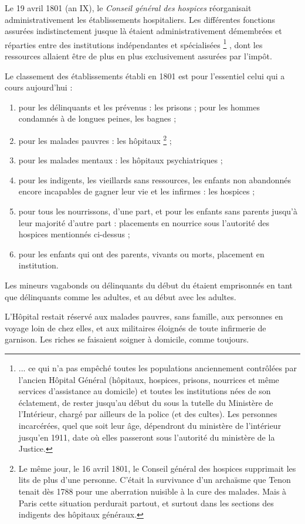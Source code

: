  Le 19 avril 1801 (an IX), le \emph{Conseil général des hospices} réorganisait administrativement les établissements hospitaliers. Les différentes fonctions assurées indistinctement jusque là étaient administrativement démembrées et réparties entre des institutions indépendantes et spécialisées%
\footnote{... ce qui n'a pas empêché toutes les populations anciennement contrôlées par l'ancien Hôpital Général (hôpitaux, hospices, prisons, nourrices et même services d'assistance au domicile) et toutes les institutions nées de son éclatement, de rester jusqu'au début du  sous la tutelle du Ministère de l'Intérieur, chargé par ailleurs de la police (et des cultes). Les personnes incarcérées, quel que soit leur âge, dépendront du ministère de l'intérieur jusqu'en 1911, date où elles passeront sous l'autorité du ministère de la Justice.}%
, dont les ressources allaient être de plus en plus exclusivement assurées par l'impôt. 

 Le classement des établissements établi en 1801 est pour l'essentiel celui qui a cours aujourd'hui :
\begin{enumerate}
\item pour les délinquants et les prévenus : les prisons ; pour les hommes condamnés à de longues peines, les bagnes ;
\item pour les malades pauvres : les hôpitaux%
\footnote{Le même jour, le 16 avril 1801, le Conseil général des hospices supprimait les lits de plus d'une personne. C'était la survivance d'un archaïsme que Tenon tenait dès 1788 pour une aberration nuisible à la cure des malades. Mais à Paris cette situation perdurait partout, et surtout dans les sections des indigents des hôpitaux généraux.} 
;
\item pour les malades mentaux : les hôpitaux psychiatriques ;
\item pour les indigents, les vieillards sans ressources, les enfants non abandonnés encore incapables de gagner leur vie et les infirmes : les hospices ;
\item pour tous les nourrissons, d'une part, et pour les enfants sans parents jusqu'à leur majorité d'autre part : placements en nourrice sous l'autorité des hospices mentionnés ci-dessus ;
\item pour les enfants qui ont des parents, vivants ou morts, placement en institution.
\end{enumerate}

 Les mineurs vagabonds ou délinquants du début du  étaient emprisonnés en tant que délinquants comme les adultes, et au début avec les adultes. 

 L'Hôpital restait réservé aux malades pauvres, sans famille, aux personnes en voyage loin de chez elles, et aux militaires éloignés de toute infirmerie de garnison. Les riches se faisaient soigner à domicile, comme toujours.


